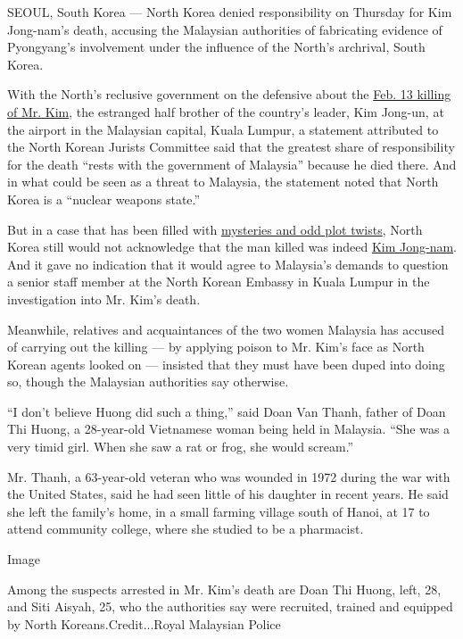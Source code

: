 SEOUL, South Korea --- North Korea denied responsibility on Thursday for
Kim Jong-nam's death, accusing the Malaysian authorities of fabricating
evidence of Pyongyang's involvement under the influence of the North's
archrival, South Korea.

With the North's reclusive government on the defensive about the
\href{https://www.nytimes.com/2017/02/14/world/asia/kim-jong-un-brother-killed-malaysia.html}{Feb.
13 killing of Mr. Kim}, the estranged half brother of the country's
leader, Kim Jong-un, at the airport in the Malaysian capital, Kuala
Lumpur, a statement attributed to the North Korean Jurists Committee
said that the greatest share of responsibility for the death ``rests
with the government of Malaysia'' because he died there. And in what
could be seen as a threat to Malaysia, the statement noted that North
Korea is a ``nuclear weapons state.''

But in a case that has been filled with
\href{https://www.nytimes.com/2017/02/22/world/asia/kim-jong-nam-assassination-korea-malaysia.html}{mysteries
and odd plot twists}, North Korea still would not acknowledge that the
man killed was indeed
\href{https://www.nytimes.com/2017/02/15/world/asia/kim-jong-nam-assassination-north-korea.html}{Kim
Jong-nam}. And it gave no indication that it would agree to Malaysia's
demands to question a senior staff member at the North Korean Embassy in
Kuala Lumpur in the investigation into Mr. Kim's death.

Meanwhile, relatives and acquaintances of the two women Malaysia has
accused of carrying out the killing --- by applying poison to Mr. Kim's
face as North Korean agents looked on --- insisted that they must have
been duped into doing so, though the Malaysian authorities say
otherwise.

``I don't believe Huong did such a thing,'' said Doan Van Thanh, father
of Doan Thi Huong, a 28-year-old Vietnamese woman being held in
Malaysia. ``She was a very timid girl. When she saw a rat or frog, she
would scream.''

Mr. Thanh, a 63-year-old veteran who was wounded in 1972 during the war
with the United States, said he had seen little of his daughter in
recent years. He said she left the family's home, in a small farming
village south of Hanoi, at 17 to attend community college, where she
studied to be a pharmacist.

Image

Among the suspects arrested in Mr. Kim's death are Doan Thi Huong, left,
28, and Siti Aisyah, 25, who the authorities say were recruited, trained
and equipped by North Koreans.Credit...Royal Malaysian Police

